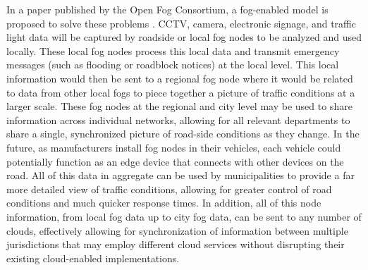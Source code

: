 \documentclass{article}
\begin{document}
In a paper published by the Open Fog Consortium, a fog-enabled model is proposed to solve these problems \cite{openfogconsortium2017trafficmanagement}. CCTV, camera, electronic signage, and traffic light data will be captured by roadside or local fog nodes to be analyzed and used locally. These local fog nodes process this local data and transmit emergency messages (such as flooding or roadblock notices) at the local level. This local information would then be sent to a regional fog node where it would be related to data from other local fogs to piece together a picture of traffic conditions at a larger scale. These fog nodes at the regional and city level may be used to share information across individual networks, allowing for all relevant departments to share a single, synchronized picture of road-side conditions as they change. In the future, as manufacturers install fog nodes in their vehicles, each vehicle could potentially function as an edge device that connects with other devices on the road. All of this data in aggregate can be used by municipalities to provide a far more detailed view of traffic conditions, allowing for greater control of road conditions and much quicker response times. In addition, all of this node information, from local fog data up to city fog data, can be sent to any number of clouds, effectively allowing for synchronization of information between multiple jurisdictions that may employ different cloud services without disrupting their existing cloud-enabled implementations.

\pagebreak

\renewcommand{\refname}{\section{References}}


\end{document}
